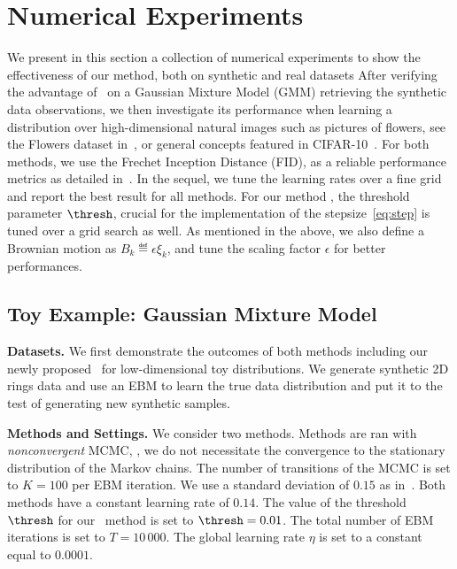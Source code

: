 \documentclass[letterpaper]{article} %
\begin{document}
\section{Numerical Experiments}\label{sec:numericals}

We present in this section a collection of numerical experiments to show the effectiveness of our method, both on synthetic and real datasets
After verifying the advantage of \algo\ on a Gaussian Mixture Model (GMM) retrieving the synthetic data observations, we then investigate its performance when learning a distribution over high-dimensional natural images such as pictures of flowers, see the Flowers dataset in~\citet{nilsback2008automated}, or general concepts featured in CIFAR-10~\cite{krizhevsky2009learning}.
For both methods, we use the Frechet Inception Distance (FID), as a reliable performance metrics as detailed in~\citet{heusel2017gans}.
In the sequel, we tune the learning rates over a fine grid and report the best result for all methods.
For our method \algo, the threshold parameter $\thresh$, crucial for the implementation of the stepsize~\eqref{eq:step} is tuned over a grid search as well.
As mentioned in the above, we also define a Brownian motion as $B_k \eqdef \epsilon \xi_k$, and tune the scaling factor $\epsilon$ for better performances.

\subsection{Toy Example: Gaussian Mixture Model}

\quad \textbf{Datasets.}
We first demonstrate the outcomes of both methods including our newly proposed \algo\ for low-dimensional toy distributions.
We generate synthetic 2D rings data and use an EBM to learn the true data distribution and put it to the test of generating new synthetic samples.

\medskip
\textbf{Methods and Settings.}
We consider two methods. 
Methods are ran with \emph{nonconvergent} MCMC, \ie, we do not necessitate the convergence to the stationary distribution of the Markov chains.
The number of transitions of the MCMC is set to $K= 100$ per EBM iteration. 
We use a standard deviation of $0.15$ as in~\citet{nijkamp2020anatomy}.
Both methods have a constant learning rate of $0.14$.
The value of the threshold $\thresh$ for our \algo\ method is set to $\thresh = 0.01$.
The total number of EBM iterations is set to $T = 10\,000$.
The global learning rate $\eta$ is set to a constant equal to $0.0001$.
\end{document}

